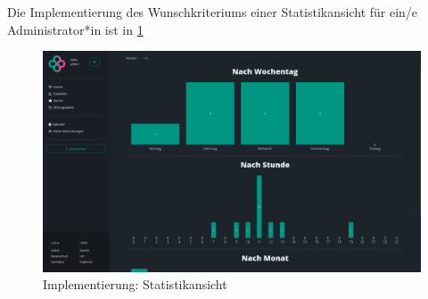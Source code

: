 Die Implementierung des Wunschkriteriums einer Statistikansicht für ein/e Administrator*in ist in \ref{fig:impl-adminstatistic}

\begin{figure}[ht]
    \centering
    \includegraphics[width=\textwidth]{figures/impl-views/admin_statistics}
    \caption{Implementierung: Statistikansicht}
    \label{fig:impl-adminstatistic}
\end{figure}